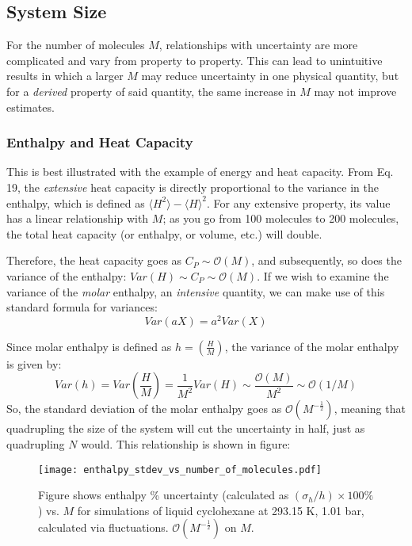 \documentclass[9pt,bestpractices]{livecoms}
\begin{document}
\subsection{System Size}
For the number of molecules $M$, relationships with uncertainty are more complicated and vary from property to property.   This can lead to unintuitive results in which a larger $M$ may reduce uncertainty in one physical quantity, but for a \emph{derived} property of said quantity, the same increase in $M$ may not improve estimates.
\subsubsection{Enthalpy and Heat Capacity}
This is best illustrated with the example of energy and heat capacity.  From Eq. 19, %
the \emph{extensive} heat capacity is directly proportional to the variance in the enthalpy, which is defined as $\langle H^2 \rangle - \langle H \rangle^2$.  For any extensive property, its value has a linear relationship with $M$; as you go from 100 molecules to 200 molecules, the total heat capacity (or enthalpy, or volume, etc.) will double.

Therefore, the heat capacity goes as $C_P \sim \mathcal{O}(M)$, and subsequently, so does the variance of the enthalpy: $ Var(H) \sim C_P \sim \mathcal{O}(M) $.  If we wish to examine the variance of the \emph{molar} enthalpy, an \emph{intensive} quantity, we can make use of this standard formula for variances:
\begin{equation}
Var(aX)=a^2Var(X)
\end{equation}

Since molar enthalpy is defined as $h=\left(\frac{H}{M}\right)$, the variance of the molar enthalpy is given by:
\begin{equation}
Var(h) = Var\left(\frac{H}{M}\right) = \frac{1}{M^2} Var(H) \sim \frac{\mathcal{O}(M)}{M^2} \sim \mathcal{O} (1/M)
\end{equation}
So, the standard deviation of the molar enthalpy goes as $\mathcal{O} (M^{-\frac{1}{2}})$, meaning that quadrupling the size of the system will cut the uncertainty in half, just as quadrupling $N$ would.  This relationship is shown in figure:

\begin{figure}[H]
\texttt{[image: enthalpy\_stdev\_vs\_number\_of\_molecules.pdf]}
\caption{Figure shows enthalpy \% uncertainty (calculated as $(\sigma_{h}/h) \times 100 \%$) vs. $M$ for simulations of liquid cyclohexane at 293.15 K, 1.01 bar, calculated via fluctuations. $\mathcal{O} (M^{-\frac{1}{2}})$ on $M$.}
\end{figure}
\end{document}
